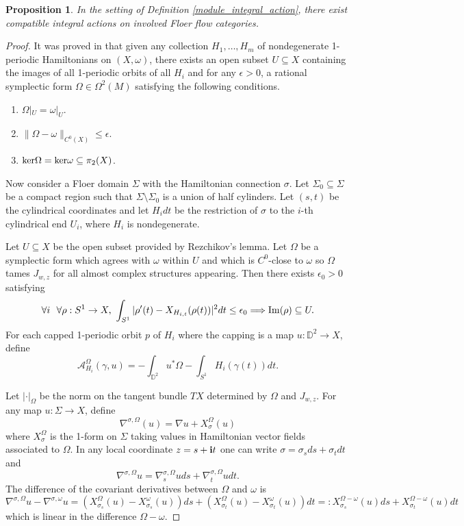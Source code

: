 \documentclass[reqno, 10pt]{amsart}
\numberwithin{equation}{section}
\numberwithin{equation}{section}
\renewcommand{\subset}{\subseteq}
\newtheorem{prop}[thm]{Proposition}
\theoremstyle{definition}
\theoremstyle{remark}
\newcommand{\beq}{\begin{equation}}
\newcommand{\eeq}{\end{equation}}
\newcommand{\beqn}{\begin{equation*}}
\newcommand{\eeqn}{\end{equation*}}
\newcommand{\mb}{\mathbb}
\newcommand{\mc}{\mathcal}
\begin{document}
\begin{prop}\label{prop163} In the setting of Definition \ref{module_integral_action}, there exist compatible integral actions on involved Floer flow categories.
\end{prop}

\begin{proof}
It was proved in \cite[Lemma 16]{Rezchikov_Arnold} that given any collection $H_1, \ldots, H_m$ of nondegenerate 1-periodic Hamiltonians on $(X, \omega)$, there exists an open subset $U\subset X$ containing the images of all 1-periodic orbits of all $H_i$ and for any $\epsilon>0$, a rational symplectic form $\Omega \in \Omega^2(M)$ satisfying the following conditions.
\begin{enumerate}
    \item $\Omega|_U = \omega|_U$.

    \item $\| \Omega - \omega\|_{C^0(X)} \leq \epsilon$.

    \item ${\rm ker} \Omega = {\rm ker} \omega \subset \pi_2(X)$.
\end{enumerate} 

Now consider a Floer domain $\Sigma$ with the Hamiltonian connection $\sigma$.  Let $\Sigma_0 \subset \Sigma$ be a compact region such that $\Sigma \setminus \Sigma_0$ is a union of half cylinders. Let $(s, t)$ be the cylindrical coordinates and let $H_i dt$ be the restriction of $\sigma$ to the $i$-th cylindrical end $U_i$, where $H_i$ is nondegenerate. 

Let $U \subset X$ be the open subset provided by Rezchikov's lemma. Let $\Omega$ be a symplectic form which agrees with $\omega$ within $U$ and which is $C^0$-close to $\omega$ so $\Omega$ tames $J_{w, z}$ for all almost complex structures appearing.  Then there exists $\epsilon_0>0$ satisfying 
\beq\label{eqn161}
\forall i\ \ \forall  \rho: S^1 \to X,\ \int_{S^1} |\rho'(t) - X_{H_{i, t}}(\rho(t))|^2 dt \leq \epsilon_0 \Longrightarrow {\rm Im}(\rho) \subset U.
\eeq
For each capped 1-periodic orbit $p$ of $H_i$ where the capping is a map $u: {\mb D}^2 \to X$, define
\beqn
{\mc A}_{H_i}^\Omega(\gamma, u) = -\int_{{\mb D}^2} u^* \Omega - \int_{S^1} H_i(\gamma(t)) dt.
\eeqn


Let $|\cdot|_\Omega$ be the norm on the tangent bundle $TX$ determined by $\Omega$ and $J_{w, z}$. For any map $u: \Sigma \to X$, define
\beqn
\nabla^{\sigma, \Omega} (u) = \nabla u + X_\sigma^\Omega(u)
\eeqn
where $X_\sigma^\Omega$ is the 1-form on $\Sigma$ taking values in Hamiltonian vector fields associated to $\Omega$. In any local coordinate $z = s + {\bf i} t$ one can write $\sigma = \sigma_s ds + \sigma_t dt$ and
\beqn
\nabla^{\sigma, \Omega} u = \nabla_s^{\sigma, \Omega} u ds + \nabla_t^{\sigma, \Omega} u dt.
\eeqn
The difference of the covariant derivatives between $\Omega$ and $\omega$ is
\beqn
\nabla^{\sigma, \Omega} u - \nabla^{\sigma, \omega} u = (X_{\sigma_s}^\Omega(u) - X_{\sigma_s}^\omega(u)) ds + (X_{\sigma_t}^\Omega(u) - X_{\sigma_t}^\omega(u)) dt =: X_{\sigma_s}^{\Omega- \omega}(u) ds + X_{\sigma_t}^{\Omega - \omega} (u) dt
\eeqn
which is linear in the difference $\Omega - \omega$. 


\end{proof}
\end{document}
